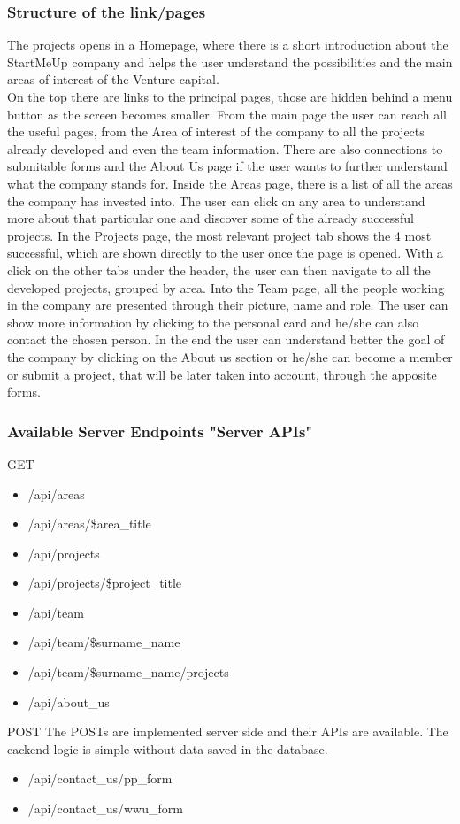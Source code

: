 \documentclass[11pt, letterpaper]{article}
\begin{document}
\subsubsection{Structure of the link/pages}
The projects opens in a Homepage, where there is a short introduction about the StartMeUp company and helps the user understand the possibilities and the main areas of interest of the Venture capital. \\
On the top there are links to the principal pages, those are hidden behind a menu button as the screen becomes smaller. From the main page the user can reach all the useful pages, from the Area of interest of the company to all the projects already developed and even the team information. There are also connections to submitable forms and the About Us page if the user wants to further understand what the company stands for.
Inside the Areas page, there is a list of all the areas the company has invested into. 
The user can click on any area to understand more about that particular one and discover some of the already successful projects. 
In the Projects page, the most relevant project tab shows the 4 most successful, which are shown directly to the user once the page is opened.
With a click on the other tabs under the header, the user can then navigate to all the developed projects, grouped by area.
Into the Team page, all the people working in the company are presented through their picture, name and role. The user can show more information by clicking to the personal card and he/she can also contact the chosen person.
In the end the user can understand better the goal of the company by clicking on the About us section or he/she can become a member or submit a project, that will be later taken into account, through the apposite forms.

\subsubsection{Available Server Endpoints "Server APIs"}
GET
\begin{itemize}
    \item /api/areas
    \item /api/areas/\$area\_title
    \item /api/projects
    \item /api/projects/\$project\_title
    \item /api/team
    \item /api/team/\$surname\_name
    \item /api/team/\$surname\_name/projects
    \item /api/about\_us
\end{itemize}
\noindent
POST
The POSTs are implemented server side and their APIs are available. The cackend logic is simple without data saved in the database.
\begin{itemize}
    \item /api/contact\_us/pp\_form
    \item /api/contact\_us/wwu\_form
\end{itemize}
\end{document}
